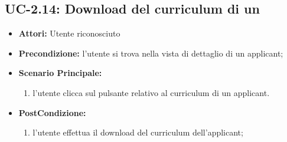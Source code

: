 \subsection{UC-2.14: Download del curriculum di un \applicant}
\begin{itemize}
	\item \textbf{Attori:} Utente riconosciuto
	\item \textbf{Precondizione:}  l'utente si trova nella vista di dettaglio di un applicant;
	\item \textbf{Scenario Principale:}
	\begin{enumerate}
		\item l'utente clicca sul pulsante relativo al curriculum di un applicant.
	\end{enumerate}
	\item \textbf{PostCondizione:} 
	\begin{enumerate}
		\item l'utente effettua il download del curriculum dell'applicant;
	\end{enumerate}
	
\end{itemize}

